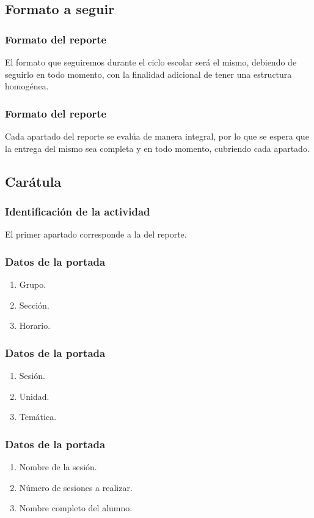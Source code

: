 \documentclass[14pt]{beamer}
\begin{document}
\subsection{Formato a seguir}

\begin{frame}
\frametitle{Formato del reporte}
El formato que seguiremos durante el ciclo escolar será el mismo, \pause debiendo de seguirlo en todo momento, con la finalidad adicional de tener una estructura homogénea.
\end{frame}
\begin{frame}
\frametitle{Formato del reporte}
Cada apartado del reporte se evalúa de manera integral, \pause por lo que se espera que la entrega del mismo sea completa y en todo momento, cubriendo cada apartado.
\end{frame}

\subsection{Carátula}

\begin{frame}
\frametitle{Identificación de la actividad}
El primer apartado corresponde a la  del reporte.
\end{frame}

\begin{frame}
\frametitle{Datos de la portada}
\begin{enumerate}[<+->]
\item Grupo.
\item Sección.
\item Horario.
\seti
\end{enumerate}
\end{frame}
\begin{frame}
\frametitle{Datos de la portada}
\begin{enumerate}[<+->]
\conti
\item Sesión.
\item Unidad.
\item Temática.
\seti
\end{enumerate}
\end{frame}
\begin{frame}
\frametitle{Datos de la portada}
\begin{enumerate}[<+->]
\conti
\item Nombre de la sesión.
\item Número de sesiones a realizar.
\item Nombre completo del alumno.
\seti
\end{enumerate}
\end{frame}
\end{document}
